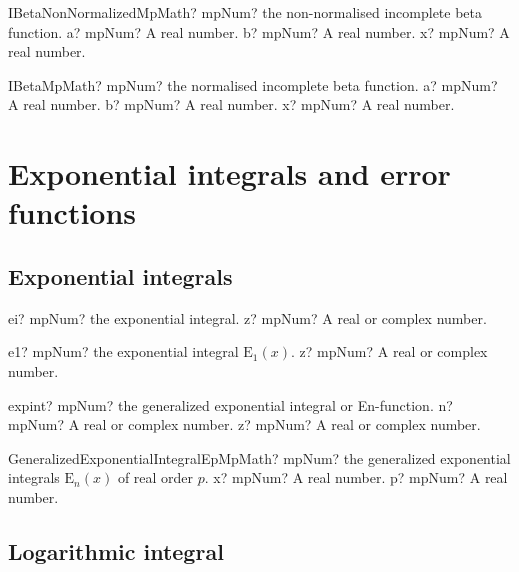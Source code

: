 \documentclass[12pt,a4paper,openany]{book}
\begin{document}
\begin{mpFunctionsExtract}
\mpFunctionThreeNotImplemented
{IBetaNonNormalizedMpMath? mpNum? the non-normalised incomplete beta function.}
{a? mpNum? A real number.}
{b? mpNum? A real number.}
{x? mpNum? A real number.}
\end{mpFunctionsExtract}

\begin{mpFunctionsExtract}
\mpFunctionThreeNotImplemented
{IBetaMpMath? mpNum? the normalised incomplete beta function.}
{a? mpNum? A real number.}
{b? mpNum? A real number.}
{x? mpNum? A real number.}
\end{mpFunctionsExtract}

\chapter{Exponential integrals and error functions}

\section{Exponential integrals}

\begin{mpFunctionsExtract}
\mpFunctionOne
{ei? mpNum? the exponential integral.}
{z? mpNum? A real or complex number.}
\end{mpFunctionsExtract}

\begin{mpFunctionsExtract}
\mpFunctionOne
{e1? mpNum? the exponential integral $\text{E}_1(x)$.}
{z? mpNum? A real or complex number.}
\end{mpFunctionsExtract}

\begin{mpFunctionsExtract}
\mpFunctionTwo
{expint? mpNum? the generalized exponential integral or En-function.}
{n? mpNum? A real or complex number.}
{z? mpNum? A real or complex number.}
\end{mpFunctionsExtract}

\begin{mpFunctionsExtract}
\mpFunctionTwoNotImplemented
{GeneralizedExponentialIntegralEpMpMath? mpNum? the generalized exponential integrals $\text{E}_n(x)$ of real order $p$.}
{x? mpNum? A real number.}
{p? mpNum? A real number.}
\end{mpFunctionsExtract}

\section{Logarithmic integral}
\end{document}
